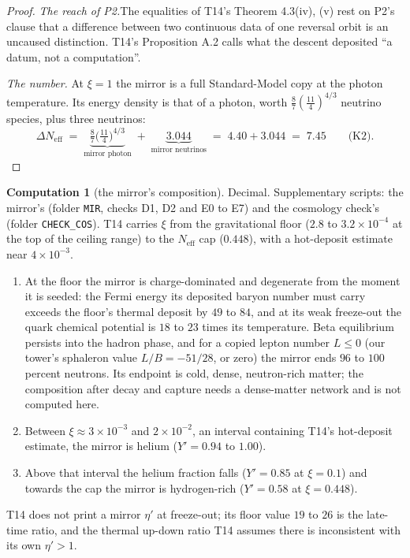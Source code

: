 \documentclass[11pt]{article}
\theoremstyle{definition}
\newtheorem{computation}[theorem]{Computation}
\newcommand{\Neff}{N_{\mathrm{eff}}}
\newcommand{\file}[1]{\texttt{#1}}
\newcommand{\pstep}[1]{\par\smallskip\noindent\textit{#1.}\enspace}
\begin{document}
\begin{proof}
\textit{The reach of P2.}\enspace The equalities of T14's Theorem 4.3(iv), (v) rest on P2's clause that a difference between two continuous data of one reversal orbit is an uncaused distinction. T14's Proposition A.2 calls what the descent deposited ``a datum, not a computation''.

\pstep{The number} At $\xi = 1$ the mirror is a full Standard-Model copy at the photon temperature. Its energy density is that of a photon, worth $\tfrac{8}{7}(\tfrac{11}{4})^{4/3}$ neutrino species, plus three neutrinos:
\[
\Delta\Neff \;=\; \underbrace{\tfrac{8}{7}\bigl(\tfrac{11}{4}\bigr)^{4/3}}_{\text{mirror photon}} \;+\; \underbrace{3.044}_{\text{mirror neutrinos}} \;=\; 4.40 + 3.044 \;=\; 7.45 \qquad \text{(K2)}.
\]
\end{proof}

\begin{computation}[the mirror's composition]\label{comp:mirror}
Decimal. Supplementary scripts: the mirror's (folder \file{MIR}, checks D1, D2 and E0 to E7) and the cosmology check's (folder \file{CHECK\_COS}). T14 carries $\xi$ from the gravitational floor ($2.8$ to $3.2 \times 10^{-4}$ at the top of the ceiling range) to the $\Neff$ cap ($0.448$), with a hot-deposit estimate near $4 \times 10^{-3}$.
\begin{enumerate}
\item[(i)] At the floor the mirror is charge-dominated and degenerate from the moment it is seeded: the Fermi energy its deposited baryon number must carry exceeds the floor's thermal deposit by $49$ to $84$, and at its weak freeze-out the quark chemical potential is $18$ to $23$ times its temperature. Beta equilibrium persists into the hadron phase, and for a copied lepton number $L \leq 0$ (our tower's sphaleron value $L/B = -51/28$, or zero) the mirror ends $96$ to $100$ percent neutrons. Its endpoint is cold, dense, neutron-rich matter; the composition after decay and capture needs a dense-matter network and is not computed here.
\item[(ii)] Between $\xi \approx 3 \times 10^{-3}$ and $2 \times 10^{-2}$, an interval containing T14's hot-deposit estimate, the mirror is helium ($Y' = 0.94$ to $1.00$).
\item[(iii)] Above that interval the helium fraction falls ($Y' = 0.85$ at $\xi = 0.1$) and towards the cap the mirror is hydrogen-rich ($Y' = 0.58$ at $\xi = 0.448$).
\end{enumerate}
T14 does not print a mirror $\eta'$ at freeze-out; its floor value $19$ to $26$ is the late-time ratio, and the thermal up-down ratio T14 assumes there is inconsistent with its own $\eta' > 1$.
\end{computation}
\end{document}

